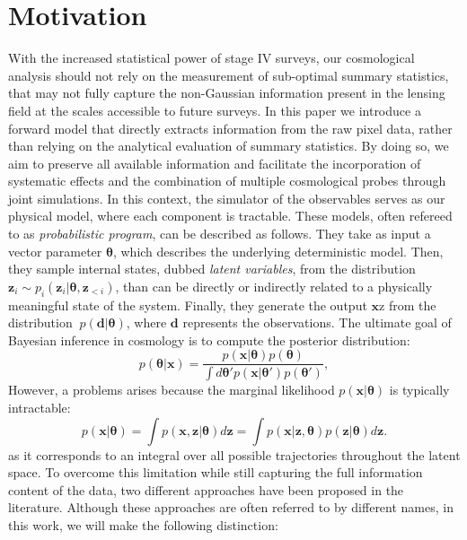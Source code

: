 \documentclass{aa}
\begin{document}
\section{Motivation}\label{Sec:Motivation}
With the increased statistical power of stage IV surveys, our cosmological analysis should not rely on the measurement of sub-optimal summary statistics, that may not fully capture the non-Gaussian information present in the lensing field at the scales accessible to future surveys. In this paper we introduce a forward model that directly extracts information from the raw pixel data, rather than relying on the analytical evaluation of summary statistics. By doing so, we aim to preserve all available information and facilitate the incorporation of systematic effects and the combination of multiple cosmological probes through joint simulations.
In this context, the simulator of the observables serves as our physical model, where each component is tractable. These models, often refereed to as \textit{probabilistic program}, can be described as follows. They take as input a vector parameter $\bm{\theta}$, which describes the underlying deterministic model. Then, they sample internal states, dubbed \textit{latent variables}, from the distribution $\bm{z}_i \sim p_i(\bm{z}_i|\bm \theta, \bm{z}_{<i})$, than can be directly or indirectly related to a physically meaningful state of the system. Finally, they generate the output $\bm x$z from the distribution $\ p(\bm d|\bm \theta)$, where $\bm{d}$ represents the observations. 
The ultimate goal of Bayesian inference in cosmology is to compute the posterior distribution:
\begin{equation}\label{Eq:posterior}
     p(\bm{\theta}|\bm{x})= 
     \frac{p(\bm{x}|\bm{\theta})p(\bm{\theta})}
     {\int d\bm{\theta'}p(\bm{x}|\bm{\theta}')p(\bm{\theta}')},
\end{equation}
However, a problems arises because the marginal likelihood $p(\bm{x}|\bm{\theta})$ is typically intractable:
\begin{equation}
    p(\bm{x}|\bm{\theta})=\int p(\bm{x},\bm{z}|\bm{\theta}) d\bm{z}=\int p(\bm{x}|\bm{z},\bm{\theta})p(\bm{z}|\bm{\theta}) d\bm{z}.
\end{equation}
as it corresponds to an integral over all possible trajectories throughout the latent space.
To overcome this limitation while still capturing the full information content of the data, two different approaches have been proposed in the literature. Although these approaches are often referred to by different names, in this work, we will make the following distinction:
\end{document}
